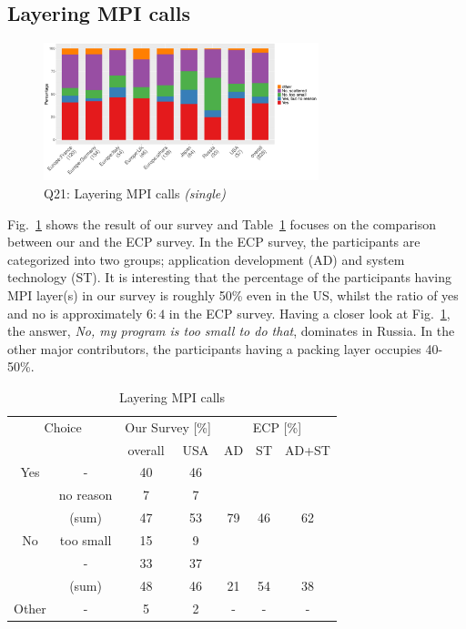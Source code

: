 \documentclass[preprint,5p,times]{elsarticle}
\def\myquote#1{{\it #1}}
\def\mcountries{major contributors\xspace{}}%
\begin{document}
\subsection{Layering MPI calls}\label{sec:mpi-calls}

\begin{figure}[tb]
  \begin{center}
    \includegraphics[width=8.0cm]{R-scripts/Q21.pdf}
    \caption{Q21: Layering MPI calls {\it(single)}}
    \label{fig:layering-mpi-calls}
\vspace{-3mm}%
  \end{center}
\end{figure}

Fig.~\ref{fig:layering-mpi-calls} shows the result of our survey and
Table~\ref{tab:layering-mpi-calls} focuses on the comparison between our
and the ECP survey. In the ECP survey, the participants are categorized
into two groups; application development (AD) and system technology
(ST). It is interesting that the percentage of the participants having
MPI layer(s) in our survey is roughly 50\% even in the US, whilst the
ratio of yes and no is approximately $6:4$ in the ECP survey.
Having a closer look at Fig.~\ref{fig:layering-mpi-calls}, the answer,
\myquote{No, my program is too small to do that}, dominates in Russia. In
the other \mcountries, the participants having a packing layer occupies
40-50\%.

\begin{table}[tb]%
  \small%
  \begin{center}%
    \caption{Layering MPI calls}\label{tab:layering-mpi-calls}%
    \begin{tabular}{c|c||c|c||c|c|c}%
      \hline%
      \multicolumn{2}{c||}{Choice} & \multicolumn{2}{c||}{Our Survey [\%]} &
      \multicolumn{3}{c}{ECP [\%]} \\
      \cline{3-7}%
      \multicolumn{2}{c||}{} & overall & USA & AD & ST & AD+ST \\
      \hline%
      \hline%
      Yes & - & 40 & 46 & & & \\
      & no reason & 7 & 7 & & & \\
      \cline{2-4}%
      & (sum) & 47 & 53 &  79 & 46 & 62 \\
      \hline%
      \hline%
      No & too small & 15 & 9 & & & \\
      & - & 33 & 37 & & & \\
      \cline{2-4}%
      & (sum) & 48 & 46 & 21 & 54 & 38 \\
      \hline%
      \hline%
      Other & - & 5 & 2 & - & - & - \\
      \hline%
    \end{tabular}%
\vspace{-3mm}%
  \end{center}%
\end{table}%
\end{document}
